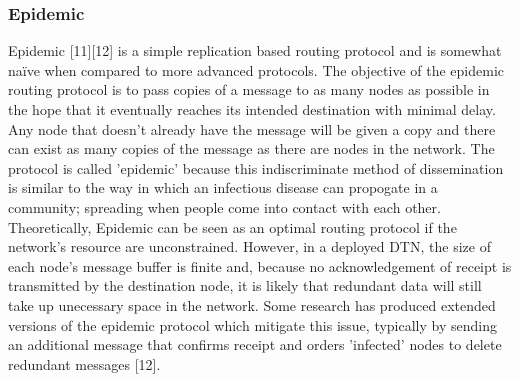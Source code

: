 \documentclass{article}
\begin{document}
\subsubsection{Epidemic}
Epidemic [11][12] is a simple replication based routing protocol and is somewhat naïve when compared to more advanced protocols. The objective of the epidemic routing protocol is to pass copies of a message to as many nodes as possible in the hope that it eventually reaches its intended destination with minimal delay. Any node that doesn't already have the message will be given a copy and there can exist as many copies of the message as there are nodes in the network. The protocol is called 'epidemic' because this indiscriminate method of dissemination is similar to the way in which an infectious disease can propogate in a community; spreading when people come into contact with each other.\\
\newline Theoretically, Epidemic can be seen as an optimal routing protocol if the network's resource are unconstrained. However, in a deployed DTN, the size of each node's message buffer is finite and, because no acknowledgement of receipt is transmitted by the destination node, it is likely that redundant data will still take up unecessary space in the network. Some research has produced extended versions of the epidemic protocol which mitigate this issue, typically by sending an additional message that confirms receipt and orders 'infected' nodes to delete redundant messages [12].
\end{document}
